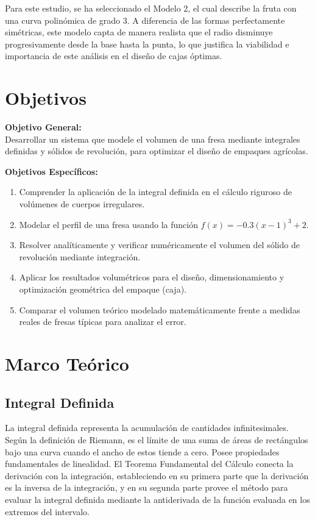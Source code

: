 \documentclass[conference, Spanish]{IEEEtran}
\begin{document}
Para este estudio, se ha seleccionado el Modelo 2, el cual describe la fruta con una curva polinómica de grado 3. A diferencia de las formas perfectamente simétricas, este modelo capta de manera realista que el radio disminuye progresivamente desde la base hasta la punta, lo que justifica la viabilidad e importancia de este análisis en el diseño de cajas óptimas.

\section{Objetivos}
\textbf{Objetivo General:}\\
Desarrollar un sistema que modele el volumen de una fresa mediante integrales definidas y sólidos de revolución, para optimizar el diseño de empaques agrícolas.

\textbf{Objetivos Específicos:}
\begin{enumerate}
    \item Comprender la aplicación de la integral definida en el cálculo riguroso de volúmenes de cuerpos irregulares.
    \item Modelar el perfil de una fresa usando la función $f(x) = -0.3(x-1)^3 + 2$.
    \item Resolver analíticamente y verificar numéricamente el volumen del sólido de revolución mediante integración.
    \item Aplicar los resultados volumétricos para el diseño, dimensionamiento y optimización geométrica del empaque (caja).
    \item Comparar el volumen teórico modelado matemáticamente frente a medidas reales de fresas típicas para analizar el error.
\end{enumerate}

\section{Marco Teórico}
\subsection{Integral Definida}
La integral definida representa la acumulación de cantidades infinitesimales. Según la definición de Riemann, es el límite de una suma de áreas de rectángulos bajo una curva cuando el ancho de estos tiende a cero. Posee propiedades fundamentales de linealidad. El Teorema Fundamental del Cálculo conecta la derivación con la integración, estableciendo en su primera parte que la derivación es la inversa de la integración, y en su segunda parte provee el método para evaluar la integral definida mediante la antiderivada de la función evaluada en los extremos del intervalo.
\end{document}
